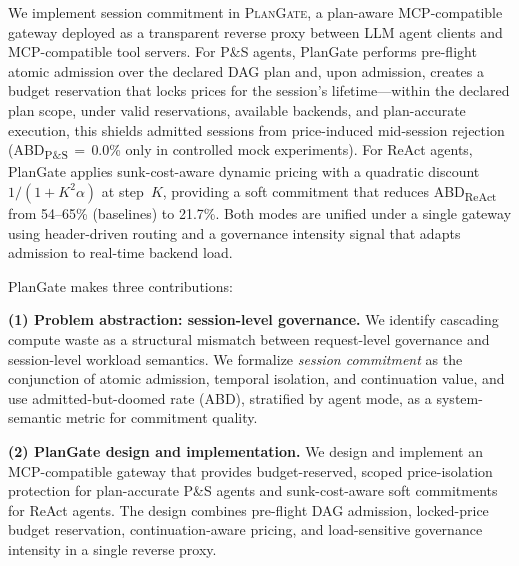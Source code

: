 \documentclass[sigconf,review,anonymous]{acmart}
\begin{document}
We implement session commitment in \textsc{PlanGate}, a plan-aware MCP-compatible gateway deployed as a transparent reverse proxy between LLM agent clients and MCP-compatible tool servers. For P\&S agents, PlanGate performs pre-flight atomic admission over the declared DAG plan and, upon admission, creates a budget reservation that locks prices for the session's lifetime---within the declared plan scope, under valid reservations, available backends, and plan-accurate execution, this shields admitted sessions from price-induced mid-session rejection (ABD\textsubscript{P\&S}$\,{=}\,$0.0\% only in controlled mock experiments). For ReAct agents, PlanGate applies sunk-cost-aware dynamic pricing with a quadratic discount $1/(1{+}K^2\alpha)$ at step~$K$, providing a soft commitment that reduces ABD\textsubscript{ReAct} from 54--65\% (baselines) to 21.7\%. Both modes are unified under a single gateway using header-driven routing and a governance intensity signal that adapts admission to real-time backend load.

PlanGate makes three contributions:

\noindent\textbf{(1) Problem abstraction: session-level governance.} We identify cascading compute waste as a structural mismatch between request-level governance and session-level workload semantics. We formalize \emph{session commitment} as the conjunction of atomic admission, temporal isolation, and continuation value, and use admitted-but-doomed rate (ABD), stratified by agent mode, as a system-semantic metric for commitment quality.

\noindent\textbf{(2) PlanGate design and implementation.} We design and implement an MCP-compatible gateway that provides budget-reserved, scoped price-isolation protection for plan-accurate P\&S agents and sunk-cost-aware soft commitments for ReAct agents. The design combines pre-flight DAG admission, locked-price budget reservation, continuation-aware pricing, and load-sensitive governance intensity in a single reverse proxy.
\end{document}
